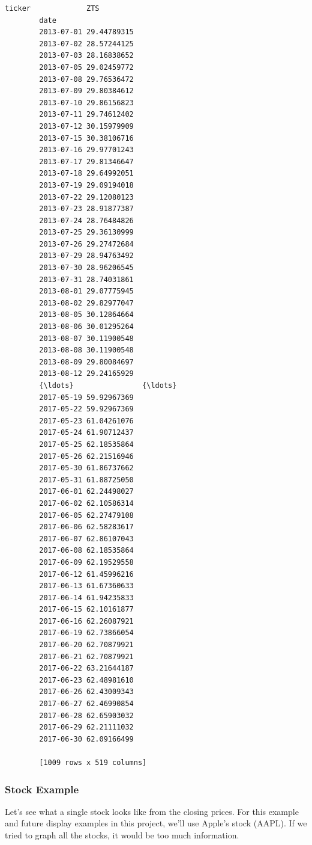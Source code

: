 \documentclass[11pt]{article}
\begin{document}
\begin{Verbatim}[commandchars=\\\{\}]
        ticker             ZTS  
        date                    
        2013-07-01 29.44789315  
        2013-07-02 28.57244125  
        2013-07-03 28.16838652  
        2013-07-05 29.02459772  
        2013-07-08 29.76536472  
        2013-07-09 29.80384612  
        2013-07-10 29.86156823  
        2013-07-11 29.74612402  
        2013-07-12 30.15979909  
        2013-07-15 30.38106716  
        2013-07-16 29.97701243  
        2013-07-17 29.81346647  
        2013-07-18 29.64992051  
        2013-07-19 29.09194018  
        2013-07-22 29.12080123  
        2013-07-23 28.91877387  
        2013-07-24 28.76484826  
        2013-07-25 29.36130999  
        2013-07-26 29.27472684  
        2013-07-29 28.94763492  
        2013-07-30 28.96206545  
        2013-07-31 28.74031861  
        2013-08-01 29.07775945  
        2013-08-02 29.82977047  
        2013-08-05 30.12864664  
        2013-08-06 30.01295264  
        2013-08-07 30.11900548  
        2013-08-08 30.11900548  
        2013-08-09 29.80084697  
        2013-08-12 29.24165929  
        {\ldots}                {\ldots}  
        2017-05-19 59.92967369  
        2017-05-22 59.92967369  
        2017-05-23 61.04261076  
        2017-05-24 61.90712437  
        2017-05-25 62.18535864  
        2017-05-26 62.21516946  
        2017-05-30 61.86737662  
        2017-05-31 61.88725050  
        2017-06-01 62.24498027  
        2017-06-02 62.10586314  
        2017-06-05 62.27479108  
        2017-06-06 62.58283617  
        2017-06-07 62.86107043  
        2017-06-08 62.18535864  
        2017-06-09 62.19529558  
        2017-06-12 61.45996216  
        2017-06-13 61.67360633  
        2017-06-14 61.94235833  
        2017-06-15 62.10161877  
        2017-06-16 62.26087921  
        2017-06-19 62.73866054  
        2017-06-20 62.70879921  
        2017-06-21 62.70879921  
        2017-06-22 63.21644187  
        2017-06-23 62.48981610  
        2017-06-26 62.43009343  
        2017-06-27 62.46990854  
        2017-06-28 62.65903032  
        2017-06-29 62.21111032  
        2017-06-30 62.09166499  
        
        [1009 rows x 519 columns]
\end{Verbatim}
            
    \hypertarget{stock-example}{%
\subsubsection{Stock Example}\label{stock-example}}

Let's see what a single stock looks like from the closing prices. For
this example and future display examples in this project, we'll use
Apple's stock (AAPL). If we tried to graph all the stocks, it would be
too much information.
\end{document}
